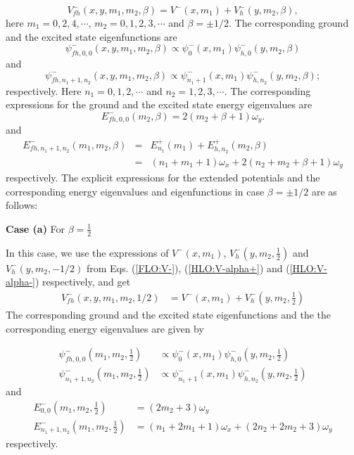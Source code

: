 \documentclass[12pt]{article}
\numberwithin{equation}{section} %
\begin{document}
\begin{equation}\label{GFHP-}
	V^-_{fh}(x,y,m_1,m_2,\beta)=V^-(x,m_1)+V^-_h (y,m_2,\beta),
\end{equation}
here $m_1=0,2,4,\cdots$, $m_2=0,1,2,3,\cdots$ and $\beta=\pm 1/2$. The 
corresponding ground and the excited state eigenfunctions are  
\begin{equation}
\psi^-_{fh,0,0}(x,y,m_1,m_2,\beta)\propto\psi^-_0 (x,m_1)\psi^-_{h,0}(y,m_2,\beta)
\end{equation}
and
\begin{equation}
\psi^-_{fh,n_1+1,n_2}(x,y,m_1,m_2,\beta)\propto\psi^-_{n_1+1} (x,m_1)\psi^-_{h,n_2}(y,m_2,\beta);	
\end{equation}
respectively. Here $n_1=0,1,2,\cdots$ and $n_2=1,2,3,\cdots$. The corresponding 
expressions for the ground and the excited state energy eigenvalues are
\begin{equation}\label{fhg}
	E^-_{fh,0,0}(m_2,\beta)=2(m_2+\beta+1)\omega_y.
\end{equation}
and
\begin{eqnarray}\label{fhexct}
	E^-_{fh,n_1+1,n_2}(m_1,m_2,\beta)&=& E^+_{n_1}(m_1)+E^+_{h,n_2}(m_2,\beta)\nonumber\\
	&=& (n_1+m_1+1)\omega_x+2(n_2+m_2+\beta+1)\omega_y		
\end{eqnarray}
respectively. The explicit expressions for the extended potentials and the corresponding energy eigenvalues and eigenfunctions in case $\beta=\pm1/2$ are as follows:

{\bf Case (a)} For \(\beta = \frac{1}{2}\)
 
In this case, we use the expressions of $V^-(x,m_1)$, $V_h^-(y,m_2,\frac{1}{2})$ and $V^-_h (y,m_2,-1/2)$ from Eqs. (\ref{FLO:V-}), (\ref{HLO:V-alpha+}) and (\ref{HLO:V-alpha-}) respectively, and get
\begin{align}
    V^-_{fh}(x,y,m_1,m_2,1/2) &= V^-(x,m_1)+V_h^-(y,m_2,\frac{1}{2})
\end{align}
The corresponding ground and the excited state eigenfunctions and the the 
corresponding energy eigenvalues are given by

\begin{align}
    \psi^-_{fh,0,0}(m_1,m_2,\frac{1}{2}) &\propto \psi^-_0 (x,m_1)\psi^-_{h,0}(y,m_2,\frac{1}{2})
    \\ 
    \psi^-_{n_1+1,n_2}(m_1,m_2,\frac{1}{2}) &\propto \psi^-_{n_1+1} (x,m_1)\psi^-_{h,n_2}(y,m_2,\frac{1}{2})
\end{align}
and 
\begin{align} 
    E^-_{0,0}(m_1,m_2,\frac{1}{2}) &=\left(2m_2+3\right)\omega_y\\
    E^-_{n_1+1,n_2}(m_1,m_2,\frac{1}{2}) &= \left(n_1+2m_1+1\right)\omega_x+ \left(2n_2+2m_2+3\right)\omega_y
\end{align}
respectively.
\end{document}
